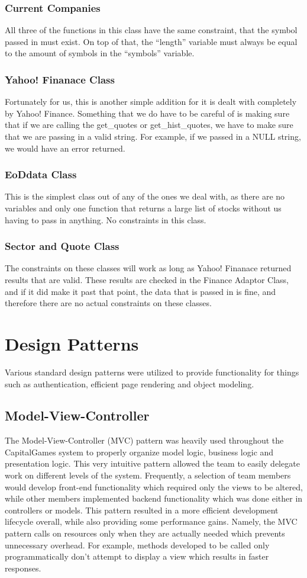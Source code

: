 \subsubsection{Current Companies}
All three of the functions in this class have the same constraint, that the symbol passed in must exist. On top of that, the ``length'' variable must always be equal to the amount of symbols in the ``symbols'' variable.
\subsubsection{Yahoo! Finanace Class}
Fortunately for us, this is another simple addition for it is dealt with completely by Yahoo! Finance. Something that we do have to be careful of is making sure that if we are calling the get\_quotes or get\_hist\_quotes, we have to make sure that we are passing in a valid string. For example, if we passed in a NULL string, we would have an error returned.
\subsubsection{EoDdata Class}
This is the simplest class out of any of the ones we deal with, as there are no variables and only one function that returns a large list of stocks without us having to pass in anything. No constraints in this class.
\subsubsection{Sector and Quote Class}
The constraints on these classes will work as long as Yahoo! Finanace returned results that are valid. These results are checked in the Finance Adaptor Class, and if it did make it past that point, the data that is passed in is fine, and therefore there are no actual constraints on these classes.


\section{Design Patterns}
Various standard design patterns were utilized to provide functionality for things such as authentication, efficient page rendering and object modeling.
\subsection{Model-View-Controller}
The Model-View-Controller (MVC) pattern was heavily used throughout the CapitalGames system to properly organize model logic, business logic and presentation logic. This very intuitive pattern allowed the team to easily delegate work on different levels of the system. Frequently, a selection of team members would develop front-end functionality which required only the views to be altered, while other members implemented backend functionality which was done either in controllers or models. This pattern resulted in a more efficient development lifecycle overall, while also providing some performance gains. Namely, the MVC pattern calls on resources only when they are actually needed which prevents unnecessary overhead. For example, methods developed to be called only programmatically don't attempt to display a view which results in faster responses.
